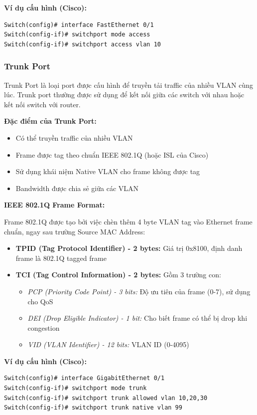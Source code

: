 \textbf{Ví dụ cấu hình (Cisco):}
\begin{verbatim}
Switch(config)# interface FastEthernet 0/1
Switch(config-if)# switchport mode access
Switch(config-if)# switchport access vlan 10
\end{verbatim}

\subsubsection{Trunk Port}
Trunk Port là loại port được cấu hình để truyền tải traffic của nhiều VLAN cùng lúc. Trunk port thường được sử dụng để kết nối giữa các switch với nhau hoặc kết nối switch với router.

\textbf{Đặc điểm của Trunk Port:}
\begin{itemize}
    \item Có thể truyền traffic của nhiều VLAN
    \item Frame được tag theo chuẩn IEEE 802.1Q (hoặc ISL của Cisco)
    \item Sử dụng khái niệm Native VLAN cho frame không được tag
    \item Bandwidth được chia sẻ giữa các VLAN
\end{itemize}

\textbf{IEEE 802.1Q Frame Format:}

Frame 802.1Q được tạo bởi việc chèn thêm 4 byte VLAN tag vào Ethernet frame chuẩn, ngay sau trường Source MAC Address:

\begin{itemize}
    \item \textbf{TPID (Tag Protocol Identifier) - 2 bytes:} Giá trị 0x8100, định danh frame là 802.1Q tagged frame
    \item \textbf{TCI (Tag Control Information) - 2 bytes:} Gồm 3 trường con:
    \begin{itemize}
        \item \textit{PCP (Priority Code Point) - 3 bits:} Độ ưu tiên của frame (0-7), sử dụng cho QoS
        \item \textit{DEI (Drop Eligible Indicator) - 1 bit:} Cho biết frame có thể bị drop khi congestion
        \item \textit{VID (VLAN Identifier) - 12 bits:} VLAN ID (0-4095)
    \end{itemize}
\end{itemize}

\textbf{Ví dụ cấu hình (Cisco):}
\begin{verbatim}
Switch(config)# interface GigabitEthernet 0/1
Switch(config-if)# switchport mode trunk
Switch(config-if)# switchport trunk allowed vlan 10,20,30
Switch(config-if)# switchport trunk native vlan 99
\end{verbatim}


